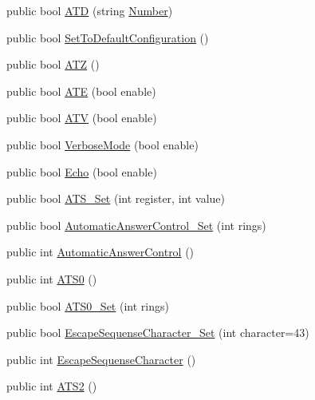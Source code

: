 \begin{DoxyCompactItemize}
\item 
public bool \hyperlink{classedwinspire_1_1Ports_1_1Modem_ad9254464bfd3463080eb3622e0da4c69}{A\-T\-D} (string \hyperlink{namespaceedwinspire_1_1Ports_a45a12d9b3e1b045369ee6b3602c231f2}{Number})
\item 
public bool \hyperlink{classedwinspire_1_1Ports_1_1Modem_a56650f780711497aa1028fec4797845f}{Set\-To\-Default\-Configuration} ()
\item 
public bool \hyperlink{classedwinspire_1_1Ports_1_1Modem_ab3311d737ec2eea314516e1f5a37ded4}{A\-T\-Z} ()
\item 
public bool \hyperlink{classedwinspire_1_1Ports_1_1Modem_a012d5b58f1a67a9feea575d90cfa6810}{A\-T\-E} (bool enable)
\item 
public bool \hyperlink{classedwinspire_1_1Ports_1_1Modem_a43bdcc328f0d7e61ea133aebcdd3d648}{A\-T\-V} (bool enable)
\item 
public bool \hyperlink{classedwinspire_1_1Ports_1_1Modem_aae5a21a838e7cf4e4e2072673fc32a9a}{Verbose\-Mode} (bool enable)
\item 
public bool \hyperlink{classedwinspire_1_1Ports_1_1Modem_a97d1fae325793dc1a567d6ef7a9fe66c}{Echo} (bool enable)
\item 
public bool \hyperlink{classedwinspire_1_1Ports_1_1Modem_af6b4d26695f9b4a227b89c598cb03236}{A\-T\-S\-\_\-\-Set} (int register, int value)
\item 
public bool \hyperlink{classedwinspire_1_1Ports_1_1Modem_a39d3ad91e7ca72429b9898b8271f7cea}{Automatic\-Answer\-Control\-\_\-\-Set} (int rings)
\item 
public int \hyperlink{classedwinspire_1_1Ports_1_1Modem_a3678cf6db42f0b0584f454df867eaa5d}{Automatic\-Answer\-Control} ()
\item 
public int \hyperlink{classedwinspire_1_1Ports_1_1Modem_a354618811cd6fc70a4ca3d509f786863}{A\-T\-S0} ()
\item 
public bool \hyperlink{classedwinspire_1_1Ports_1_1Modem_aa61c58d06ac73a4676c21700c2bfdde7}{A\-T\-S0\-\_\-\-Set} (int rings)
\item 
public bool \hyperlink{classedwinspire_1_1Ports_1_1Modem_ada89e1d686076b9e6374bf9d7b96e990}{Escape\-Sequense\-Character\-\_\-\-Set} (int character=43)
\item 
public int \hyperlink{classedwinspire_1_1Ports_1_1Modem_a47cee6bf37c38e0b9d1b800905160ef9}{Escape\-Sequense\-Character} ()
\item 
public int \hyperlink{classedwinspire_1_1Ports_1_1Modem_afccdb8bce4db05dc97ff13c790de187d}{A\-T\-S2} ()

\end{DoxyCompactItemize}
